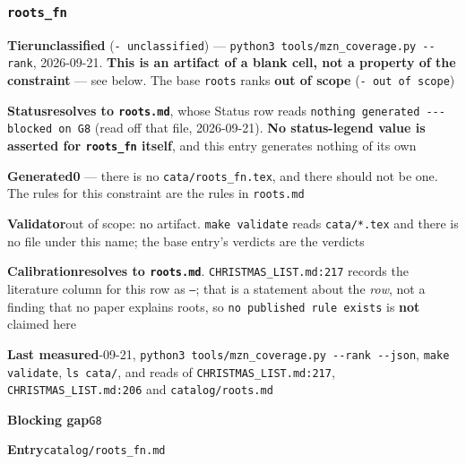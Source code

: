 \documentclass[10pt,a4paper]{article}
\newcommand{\entryfield}[2]{{\raggedright\textbf{#1}\quad #2\par}}
\begin{document}
\subsubsection*{\texttt{roots\_\allowbreak{}fn}}
\label{entry:roots-fn}
\entryfield{Tier}{\textbf{unclassified} (\texttt{- unclassified}) --- \texttt{python3 tools/\allowbreak{}mzn\_\allowbreak{}coverage.\allowbreak{}py -\allowbreak{}-\allowbreak{}rank}, 2026-09-21. \textbf{This is an artifact of a blank cell, not a property of the constraint} --- see below. The base \texttt{roots} ranks \textbf{out of scope} (\texttt{- out of scope})}
\entryfield{Status}{\textbf{resolves to \texttt{roots.md}}, whose Status row reads \texttt{nothing generated -\allowbreak{}-\allowbreak{}-\allowbreak{} blocked on G8} (read off that file, 2026-09-21). \textbf{No status-legend value is asserted for \texttt{roots\_fn} itself}, and this entry generates nothing of its own}
\entryfield{Generated}{\textbf{0} --- there is no \texttt{cata/roots\_fn.tex}, and there should not be one. The rules for this constraint are the rules in \texttt{roots.md}}
\entryfield{Validator}{out of scope: no artifact. \texttt{make validate} reads \texttt{cata/*.tex} and there is no file under this name; the base entry's verdicts are the verdicts}
\entryfield{Calibration}{\textbf{resolves to \texttt{roots.md}}. \texttt{CHRISTMAS\_LIST.md:217} records the literature column for this row as \texttt{---}; that is a statement about the \emph{row}, not a finding that no paper explains roots, so \texttt{no published rule exists} is \textbf{not} claimed here}
\entryfield{Last measured}{2026-09-21, \texttt{python3 tools/\allowbreak{}mzn\_\allowbreak{}coverage.\allowbreak{}py -\allowbreak{}-\allowbreak{}rank -\allowbreak{}-\allowbreak{}json}, \texttt{make validate}, \texttt{ls cata/}, and reads of \texttt{CHRISTMAS\_LIST.md:217}, \texttt{CHRISTMAS\_LIST.md:206} and \texttt{catalog/roots.md}}
\entryfield{Blocking gap}{\texttt{G8}}
\entryfield{Entry}{\texttt{catalog/roots\_fn.md}}
\end{document}
